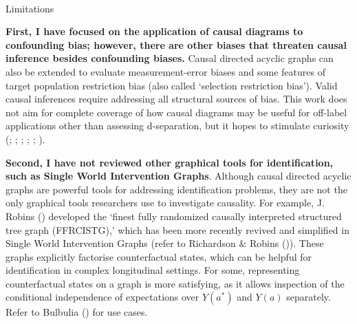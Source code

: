 \documentclass[
  single column]{article}
\makeatletter
\let\oldparagraph\paragraph
\renewcommand{\paragraph}{
    \@ifstar
      \xxxParagraphStar
      \xxxParagraphNoStar
  }
\newcommand{\xxxParagraphStar}[1]{\oldparagraph*{#1}\mbox{}}
\newcommand{\xxxParagraphNoStar}[1]{\oldparagraph{#1}\mbox{}}
\makeatother
\begin{document}
\paragraph{Limitations}\label{limitations}

\textbf{First, I have focused on the application of causal diagrams to
confounding bias; however, there are other biases that threaten causal
inference besides confounding biases.} Causal directed acyclic graphs
can also be extended to evaluate measurement-error biases and some
features of target population restriction bias (also called `selection
restriction bias'). Valid causal inferences require addressing all
structural sources of bias. This work does not aim for complete coverage
of how causal diagrams may be useful for off-label applications other
than assessing d-separation, but it hopes to stimulate curiosity
(;
;
;
;
;
).

\textbf{Second, I have not reviewed other graphical tools for
identification, such as Single World Intervention Graphs}. Although
causal directed acyclic graphs are powerful tools for addressing
identification problems, they are not the only graphical tools
researchers use to investigate causality. For example, J. Robins
() developed the `finest fully randomized
causally interpreted structured tree graph (FFRCISTG),' which has been
more recently revived and simplified in Single World Intervention Graphs
(refer to Richardson \& Robins
()). These graphs
explicitly factorise counterfactual states, which can be helpful for
identification in complex longitudinal settings. For some, representing
counterfactual states on a graph is more satisfying, as it allows
inspection of the conditional independence of expectations over
\(Y(a^*)\) and \(Y(a)\) separately. Refer to Bulbulia
() for use cases.
\end{document}
